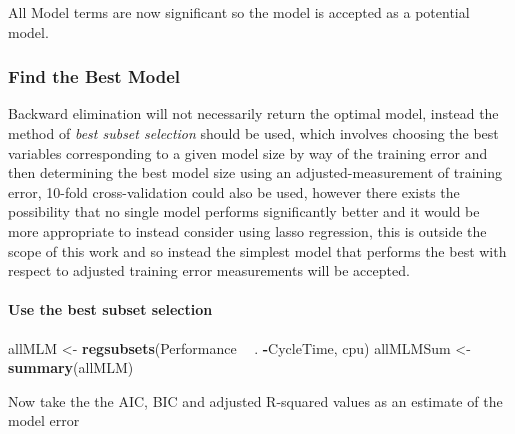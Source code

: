 \documentclass[12pt]{article}
\newenvironment{Shaded}{\begin{snugshade}}{\end{snugshade}}
\newcommand{\KeywordTok}[1]{\textcolor[rgb]{0.13,0.29,0.53}{\textbf{#1}}}
\newcommand{\NormalTok}[1]{#1}
\newcommand{\OperatorTok}[1]{\textcolor[rgb]{0.81,0.36,0.00}{\textbf{#1}}}
\newcommand{\StringTok}[1]{\textcolor[rgb]{0.31,0.60,0.02}{#1}}
\let\oldparagraph\paragraph
\renewcommand{\paragraph}[1]{\oldparagraph{#1}\mbox{}}
\begin{document}
All Model terms are now significant so the model is accepted as a
potential model.

\hypertarget{find-the-best-model}{%
\subsubsection{Find the Best Model}\label{find-the-best-model}}

Backward elimination will not necessarily return the optimal model,
instead the method of \emph{best subset selection} should be used, which
involves choosing the best variables corresponding to a given model size
by way of the training error and then determining the best model size
using an adjusted-measurement of training error, 10-fold
cross-validation could also be used, however there exists the
possibility that no single model performs significantly better and it
would be more appropriate to instead consider using lasso regression,
this is outside the scope of this work and so instead the simplest model
that performs the best with respect to adjusted training error
measurements will be accepted.

\hypertarget{use-the-best-subset-selection}{%
\paragraph{Use the best subset
selection}\label{use-the-best-subset-selection}}

\begin{Shaded}
\begin{Highlighting}[]
\NormalTok{allMLM <-}\StringTok{ }\KeywordTok{regsubsets}\NormalTok{(Performance }\OperatorTok{~}\StringTok{ }\NormalTok{. }\OperatorTok{-}\NormalTok{CycleTime, cpu)}
\NormalTok{allMLMSum <-}\StringTok{ }\KeywordTok{summary}\NormalTok{(allMLM)}
\end{Highlighting}
\end{Shaded}

Now take the the AIC, BIC and adjusted R-squared values as an estimate
of the model error
\end{document}
